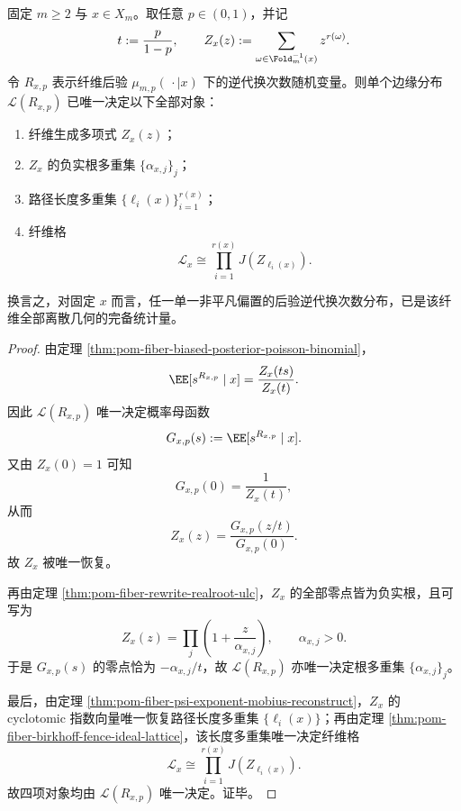 \begin{theorem}[单偏置后验的刚性完备性]\label{thm:conclusion-single-bias-posterior-complete-fiber-statistic}
固定 \(m\ge 2\) 与 \(x\in X_m\)。取任意 \(p\in(0,1)\)，并记
\[
t:=\frac{p}{1-p},
\qquad
Z_x(z):=\sum_{\omega\in \Fold_m^{-1}(x)} z^{r(\omega)}.
\]
令 \(R_{x,p}\) 表示纤维后验 \(\mu_{m,p}(\,\cdot\mid x)\) 下的逆代换次数随机变量。则单个边缘分布 \(\mathcal L(R_{x,p})\) 已唯一决定以下全部对象：
\begin{enumerate}
  \item 纤维生成多项式 \(Z_x(z)\)；
  \item \(Z_x\) 的负实根多重集 \(\{\alpha_{x,j}\}_j\)；
  \item 路径长度多重集 \(\{\ell_i(x)\}_{i=1}^{r(x)}\)；
  \item 纤维格
  \[
  \mathcal L_x\cong \prod_{i=1}^{r(x)}J(Z_{\ell_i(x)}).
  \]
\end{enumerate}
换言之，对固定 \(x\) 而言，任一单一非平凡偏置的后验逆代换次数分布，已是该纤维全部离散几何的完备统计量。
\end{theorem}
\begin{proof}
由定理 \ref{thm:pom-fiber-biased-posterior-poisson-binomial}，
\[
\EE[s^{R_{x,p}}\mid x]=\frac{Z_x(ts)}{Z_x(t)}.
\]
因此 \(\mathcal L(R_{x,p})\) 唯一决定概率母函数
\[
G_{x,p}(s):=\EE[s^{R_{x,p}}\mid x].
\]
又由 \(Z_x(0)=1\) 可知
\[
G_{x,p}(0)=\frac{1}{Z_x(t)},
\]
从而
\[
Z_x(z)=\frac{G_{x,p}(z/t)}{G_{x,p}(0)}.
\]
故 \(Z_x\) 被唯一恢复。

再由定理 \ref{thm:pom-fiber-rewrite-realroot-ulc}，\(Z_x\) 的全部零点皆为负实根，且可写为
\[
Z_x(z)=\prod_{j}\left(1+\frac{z}{\alpha_{x,j}}\right),
\qquad
\alpha_{x,j}>0.
\]
于是 \(G_{x,p}(s)\) 的零点恰为 \(-\alpha_{x,j}/t\)，故 \(\mathcal L(R_{x,p})\) 亦唯一决定根多重集 \(\{\alpha_{x,j}\}_j\)。

最后，由定理 \ref{thm:pom-fiber-psi-exponent-mobius-reconstruct}，\(Z_x\) 的 cyclotomic 指数向量唯一恢复路径长度多重集 \(\{\ell_i(x)\}\)；再由定理 \ref{thm:pom-fiber-birkhoff-fence-ideal-lattice}，该长度多重集唯一决定纤维格
\[
\mathcal L_x\cong \prod_{i=1}^{r(x)}J(Z_{\ell_i(x)}).
\]
故四项对象均由 \(\mathcal L(R_{x,p})\) 唯一决定。证毕。
\end{proof}

